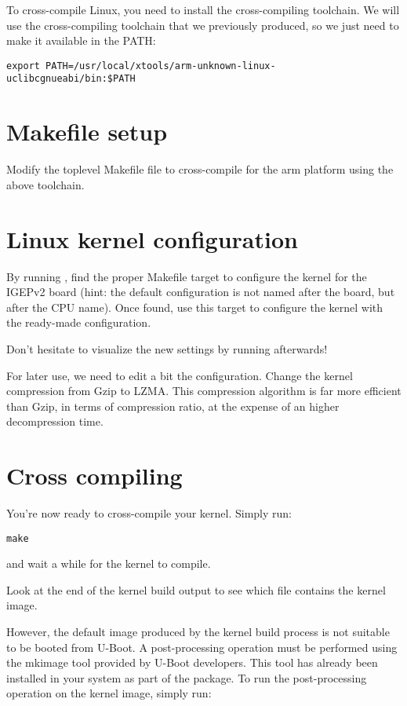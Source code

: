 To cross-compile Linux, you need to install the cross-compiling
toolchain. We will use the cross-compiling toolchain that we
previously produced, so we just need to make it available in the PATH:

\begin{verbatim}
export PATH=/usr/local/xtools/arm-unknown-linux-uclibcgnueabi/bin:$PATH
\end{verbatim}

\section{Makefile setup}

Modify the toplevel Makefile file to cross-compile for the arm
platform using the above toolchain.

\section{Linux kernel configuration}

By running , find the proper Makefile target to
configure the kernel for the IGEPv2 board (hint: the default
configuration is not named after the board, but after the CPU
name). Once found, use this target to configure the kernel with the
ready-made configuration.

Don't hesitate to visualize the new settings by running
 afterwards!

For later use, we need to edit a bit the configuration. Change the
kernel compression from Gzip to LZMA. This compression algorithm is
far more efficient than Gzip, in terms of compression ratio, at the
expense of an higher decompression time.

\section{Cross compiling}

You're now ready to cross-compile your kernel. Simply run:

\begin{verbatim}
make
\end{verbatim}

and wait a while for the kernel to compile.

Look at the end of the kernel build output to see which file contains
the kernel image.

However, the default image produced by the kernel build process is not
suitable to be booted from U-Boot. A post-processing operation must be
performed using the mkimage tool provided by U-Boot developers. This
tool has already been installed in your system as part of the
 package. To run the post-processing operation on
the kernel image, simply run:

